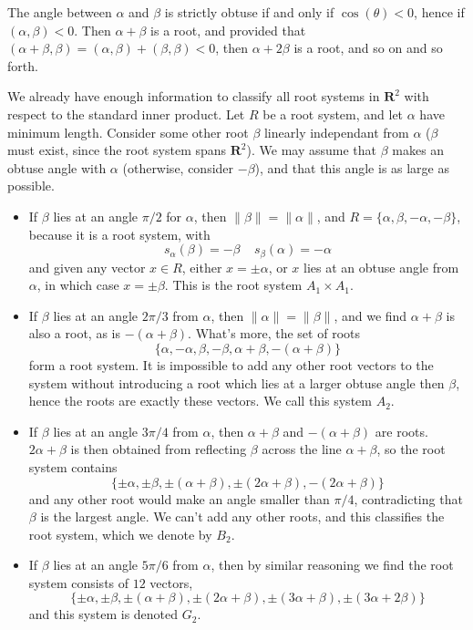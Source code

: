 The angle between $\alpha$ and $\beta$ is strictly obtuse if and only if $\cos(\theta) < 0$, hence if $(\alpha, \beta) < 0$. Then $\alpha + \beta$ is a root, and provided that $(\alpha + \beta, \beta) = (\alpha , \beta) + (\beta, \beta) < 0$, then $\alpha + 2 \beta$ is a root, and so on and so forth.

\begin{example}
    We already have enough information to classify all root systems in $\mathbf{R}^2$ with respect to the standard inner product. Let $R$ be a root system, and let $\alpha$ have minimum length. Consider some other root $\beta$ linearly independant from $\alpha$ ($\beta$ must exist, since the root system spans $\mathbf{R}^2$). We may assume that $\beta$ makes an obtuse angle with $\alpha$ (otherwise, consider $-\beta$), and that this angle is as large as possible.
    \begin{itemize}
        \item If $\beta$ lies at an angle $\pi/2$ for $\alpha$, then $\| \beta \| = \| \alpha \|$, and $R = \{ \alpha, \beta, -\alpha, -\beta \}$, because it is a root system, with
        \[ s_\alpha(\beta) = -\beta\ \ \ \ \ s_\beta(\alpha) = -\alpha \]
        and given any vector $x \in R$, either $x = \pm \alpha$, or $x$ lies at an obtuse angle from $\alpha$, in which case $x = \pm \beta$. This is the root system $A_1 \times A_1$.

        \item If $\beta$ lies at an angle $2\pi/3$ from $\alpha$, then $\| \alpha \| = \| \beta \|$, and we find $\alpha + \beta$ is also a root, as is $-(\alpha + \beta)$. What's more, the set of roots
        \[ \{ \alpha, -\alpha, \beta, -\beta, \alpha + \beta, -(\alpha + \beta) \} \]
        form a root system. It is impossible to add any other root vectors to the system without introducing a root which lies at a larger obtuse angle then $\beta$, hence the roots are exactly these vectors. We call this system $A_2$.

        \item If $\beta$ lies at an angle $3\pi/4$ from $\alpha$, then $\alpha + \beta$ and $-(\alpha + \beta)$ are roots. $2\alpha + \beta$ is then obtained from reflecting $\beta$ across the line $\alpha + \beta$, so the root system contains
        \[ \{ \pm \alpha, \pm \beta, \pm(\alpha + \beta), \pm (2\alpha + \beta), -(2\alpha + \beta) \} \]
        and any other root would make an angle smaller than $\pi/4$, contradicting that $\beta$ is the largest angle. We can't add any other roots, and this classifies the root system, which we denote by $B_2$.

        \item If $\beta$ lies at an angle $5\pi/6$ from $\alpha$, then by similar reasoning we find the root system consists of $12$ vectors,
        \[ \{ \pm \alpha, \pm \beta, \pm(\alpha + \beta), \pm(2\alpha + \beta), \pm (3\alpha + \beta), \pm (3\alpha + 2\beta) \} \]
        and this system is denoted $G_2$.
    \end{itemize}
\end{example}

